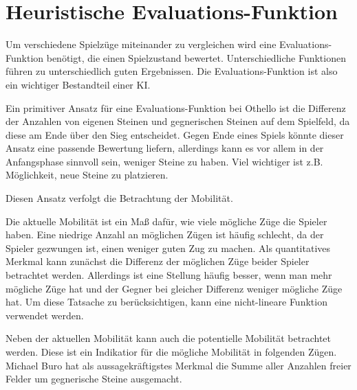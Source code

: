 \section{Heuristische Evaluations-Funktion}

Um verschiedene Spielzüge miteinander zu vergleichen wird eine Evaluations-Funktion benötigt, die einen Spielzustand bewertet.
Unterschiedliche Funktionen führen zu unterschiedlich guten Ergebnissen.
Die Evaluations-Funktion ist also ein wichtiger Bestandteil einer KI.

Ein primitiver Ansatz für eine Evaluations-Funktion bei Othello ist die Differenz der Anzahlen von eigenen Steinen und gegnerischen Steinen auf dem Spielfeld, da diese am Ende über den Sieg entscheidet.
Gegen Ende eines Spiels könnte dieser Ansatz eine passende Bewertung liefern, allerdings kann es vor allem in der Anfangsphase sinnvoll sein, weniger Steine zu haben.
Viel wichtiger ist z.B. Möglichkeit, neue Steine zu platzieren.

Diesen Ansatz verfolgt die Betrachtung der Mobilität.

Die aktuelle Mobilität ist ein Maß dafür, wie viele mögliche Züge die Spieler haben.
Eine niedrige Anzahl an möglichen Zügen ist häufig schlecht, da der Spieler gezwungen ist, einen weniger guten Zug zu machen.
Als quantitatives Merkmal kann zunächst die Differenz der möglichen Züge beider Spieler betrachtet werden.
Allerdings ist eine Stellung häufig besser, wenn man mehr mögliche Züge hat und der Gegner bei gleicher Differenz weniger mögliche Züge hat.
Um diese Tatsache zu berücksichtigen, kann eine nicht-lineare Funktion verwendet werden.
\cite[S. 7]{evaluationfunctions}

Neben der aktuellen Mobilität kann auch die potentielle Mobilität betrachtet werden.
Diese ist ein Indikatior für die mögliche Mobilität in folgenden Zügen.
Michael Buro hat als aussagekräftigstes Merkmal die Summe aller Anzahlen freier Felder um gegnerische Steine ausgemacht.
\cite[S. 8f.]{evaluationfunctions}

